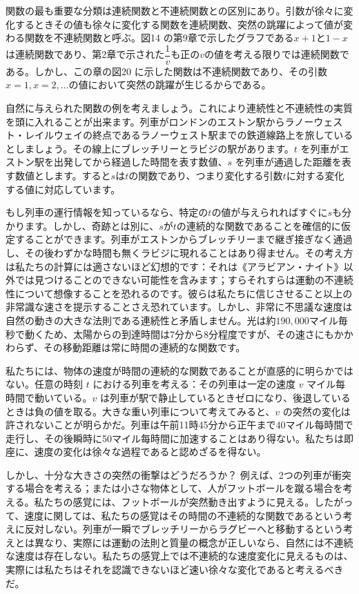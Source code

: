 \documentclass[a4paper,11pt,openany]{ltjsbook}
\begin{document}
関数の最も重要な分類は連続関数と不連続関数との区別にあり。引数が徐々に変化するときその値も徐々に変化する関数を連続関数、突然の跳躍によって値が変わる関数を不連続関数と呼ぶ。図14 の第9章で示したグラフである$x + 1$と$1 - x$は連続関数であり、第2章で示された$\dfrac{1}{v}$も正の$v$の値を考える限りでは連続関数である。しかし、この章の図20 に示した関数は不連続関数であり、その引数$x = 1, x = 2,\ldots$の値において突然の跳躍が生じるからである。

自然に与えられた関数の例を考えましょう。これにより連続性と不連続性の実質を頭に入れることが出来ます。列車がロンドンのエストン駅からラノーウェスト・レイルウェイの終点であるラノーウェスト駅までの鉄道線路上を旅しているとしましょう。その線上にブレッチリーとラビジの駅があります。$t$ を列車がエストン駅を出発してから経過した時間を表す数値、$s$ を列車が通過した距離を表す数値とします。すると$s$は$t$の関数であり、つまり変化する引数$t$に対する変化する値に対応しています。

もし列車の運行情報を知っているなら、特定の$t$の値が与えられればすぐに$s$も分かります。しかし、奇跡とは別に、$s$が$t$の連続的な関数であることを確信的に仮定することができます。列車がエストンからブレッチリーまで継ぎ接ぎなく通過し、その後わずかな時間も無くラビジに現れることはあり得ません。その考え方は私たちの計算には適さないほど幻想的です：それは《アラビアン・ナイト》以外では見つけることのできない可能性を含みます；すらそれすらは運動の不連続性について想像することを恐れるのです。彼らは私たちに信じさせること以上の非常識な速さを提示することさえ恐れています。しかし、非常に不思議な速度は自然の動きの大きな法則である連続性と矛盾しません。光は約$190,000$マイル毎秒で動くため、太陽からの到達時間は7分から8分程度ですが、その速さにもかかわらず、その移動距離は常に時間の連続的な関数です。

私たちには、物体の速度が時間の連続的な関数であることが直感的に明らかではない。任意の時刻 \( t \) における列車を考える：その列車は一定の速度 \( v \) マイル每時間で動いている。\( v \) は列車が駅で静止しているときゼロになり、後退しているときは負の値を取る。大きな重い列車について考えてみると、\( v \) の突然の変化は許されないことが明らかだ。列車は午前11時45分から正午まで40マイル每時間で走行し、その後瞬時に50マイル每時間に加速することはあり得ない。私たちは即座に、速度の変化は徐々な過程であると認めざるを得ない。

しかし、十分な大きさの突然の衝撃はどうだろうか？ 例えば、2つの列車が衝突する場合を考える；または小さな物体として、人がフットボールを蹴る場合を考える。私たちの感覚には、フットボールが突然動き出すように見える。したがって、速度に関しては、私たちの感覚はその時間の不連続的な関数であるという考えに反対しない。列車が一瞬でブレッチリーからラグビーへと移動するという考えとは異なり、実際には運動の法則と質量の概念が正しいなら、自然には不連続な速度は存在しない。私たちの感覚上では不連続的な速度変化に見えるものは、実際には私たちはそれを認識できないほど速い徐々な変化であると考えるべきだ。
\end{document}
